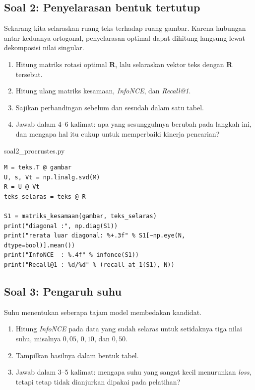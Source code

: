\documentclass[12pt, a4paper]{article}
\begin{document}
\subsection{Soal 2: Penyelarasan bentuk tertutup}

Sekarang kita selaraskan ruang teks terhadap ruang gambar. Karena hubungan antar
keduanya ortogonal, penyelarasan optimal dapat dihitung langsung lewat dekomposisi
nilai singular.

\begin{enumerate}
  \item Hitung matriks rotasi optimal $\mathbf{R}$, lalu selaraskan vektor teks
        dengan $\mathbf{R}$ tersebut.
  \item Hitung ulang matriks kesamaan, \emph{InfoNCE}, dan \emph{Recall@1}.
  \item Sajikan perbandingan sebelum dan sesudah dalam satu tabel.
  \item Jawab dalam 4--6 kalimat: apa yang sesungguhnya berubah pada langkah ini, dan
        mengapa hal itu cukup untuk memperbaiki kinerja pencarian?
\end{enumerate}

\begin{codewindow}{soal2\_procrustes.py}
\begin{lstlisting}[style=pycode]
M = teks.T @ gambar
U, s, Vt = np.linalg.svd(M)
R = U @ Vt
teks_selaras = teks @ R

S1 = matriks_kesamaan(gambar, teks_selaras)
print("diagonal :", np.diag(S1))
print("rerata luar diagonal: %+.3f" % S1[~np.eye(N, dtype=bool)].mean())
print("InfoNCE  : %.4f" % infonce(S1))
print("Recall@1 : %d/%d" % (recall_at_1(S1), N))
\end{lstlisting}
\end{codewindow}

\subsection{Soal 3: Pengaruh suhu}

Suhu menentukan seberapa tajam model membedakan kandidat.

\begin{enumerate}
  \item Hitung \emph{InfoNCE} pada data yang sudah selaras untuk setidaknya tiga
        nilai suhu, misalnya $0{,}05$, $0{,}10$, dan $0{,}50$.
  \item Tampilkan hasilnya dalam bentuk tabel.
  \item Jawab dalam 3--5 kalimat: mengapa suhu yang sangat kecil menurunkan
        \emph{loss}, tetapi tetap tidak dianjurkan dipakai pada pelatihan?
\end{enumerate}
\end{document}
